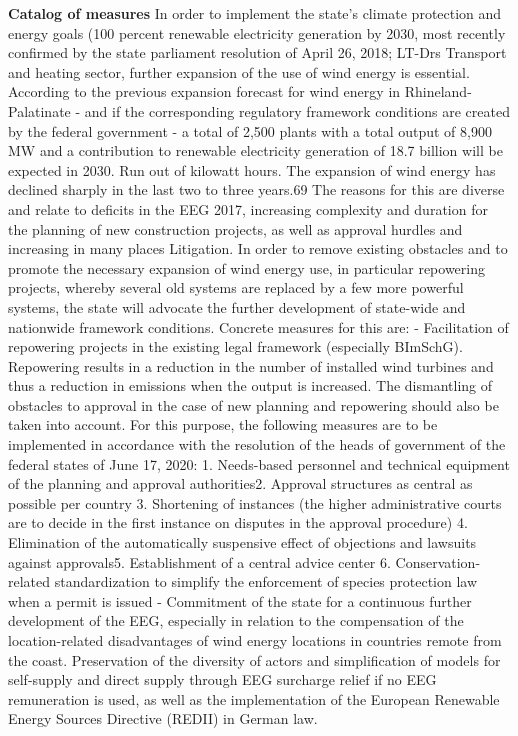 \documentclass[a4paper,11pt]{article}
\begin{document}
\textbf{Catalog of measures}
In order to implement the state's climate protection and energy goals (100 percent renewable electricity generation by 2030, most recently confirmed by the state parliament resolution of April 26, 2018; LT-Drs Transport and heating sector, further expansion of the use of wind energy is essential. According to the previous expansion forecast for wind energy in Rhineland-Palatinate - and if the corresponding regulatory framework conditions are created by the federal government - a total of 2,500 plants with a total output of 8,900 MW and a contribution to renewable electricity generation of 18.7 billion will be expected in 2030. Run out of kilowatt hours. The expansion of wind energy has declined sharply in the last two to three years.69 The reasons for this are diverse and relate to deficits in the EEG 2017, increasing complexity and duration for the planning of new construction projects, as well as approval hurdles and increasing in many places Litigation. In order to remove existing obstacles and to promote the necessary expansion of wind energy use, in particular repowering projects, whereby several old systems are replaced by a few more powerful systems, the state will advocate the further development of state-wide and nationwide framework conditions. Concrete measures for this are:
- Facilitation of repowering projects in the existing legal framework (especially BImSchG). Repowering results in a reduction in the number of installed wind turbines and thus a reduction in emissions when the output is increased. The dismantling of obstacles to approval in the case of new planning and repowering should also be taken into account.
For this purpose, the following measures are to be implemented in accordance with the resolution of the heads of government of the federal states of June 17, 2020: 1. Needs-based personnel and technical equipment of the planning and approval authorities2. Approval structures as central as possible per country 3. Shortening of instances (the higher administrative courts are to decide in the first instance on disputes in the approval procedure) 4. Elimination of the automatically suspensive effect of objections and lawsuits against approvals5. Establishment of a central advice center 6. Conservation-related standardization to simplify the enforcement of species protection law when a permit is issued
- Commitment of the state for a continuous further development of the EEG, especially in relation to the compensation of the location-related disadvantages of wind energy locations in countries remote from the coast. Preservation of the diversity of actors and simplification of models for self-supply and direct supply through EEG surcharge relief if no EEG remuneration is used, as well as the implementation of the European Renewable Energy Sources Directive (REDII) in German law.
\end{document}
